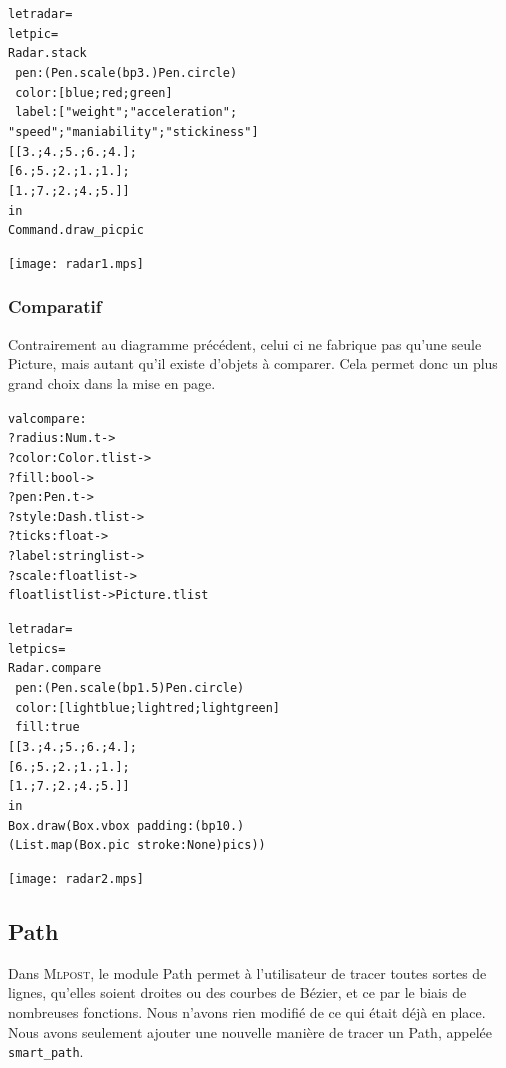 \documentclass[a4paper,12pt]{article}
\newcommand{\mlpost}{\textsc{Mlpost}}
\begin{document}
\bigskip

\begin{minipage}{0.5\linewidth}
  \begin{alltt}
    let radar =
    let pic =
    Radar.stack
    ~pen:(Pen.scale (bp 3.) Pen.circle)
    ~color:[blue;red;green]
    ~label:["weight";"acceleration";
      "speed";"maniability";"stickiness"]
    [[3.;4.;5.;6.;4.];
      [6.;5.;2.;1.;1.];
      [1.;7.;2.;4.;5.]]
    in
    Command.draw_pic pic
  \end{alltt}
\end{minipage}
\begin{minipage}{0.5\linewidth}
\begin{center}
\texttt{[image: radar1.mps]}
\end{center}
\end{minipage}

\subsubsection{Comparatif}
Contrairement au diagramme précédent, celui ci ne fabrique pas qu'une seule Picture, mais autant qu'il existe d'objets à comparer. Cela permet donc un plus grand choix dans la mise en page.
\begin{alltt}
 val compare :
 ?radius:Num.t ->
 ?color:Color.t list ->
 ?fill:bool ->
 ?pen:Pen.t ->
 ?style:Dash.t list ->
 ?ticks:float ->
 ?label:string list ->
 ?scale:float list ->
 float list list -> Picture.t list
\end{alltt}


\bigskip

\begin{minipage}{0.5\linewidth}
  \begin{alltt}
    let radar =
    let pics =
    Radar.compare
    ~pen:(Pen.scale (bp 1.5) Pen.circle)
    ~color:[lightblue;lightred;lightgreen] 
    ~fill:true
    [[3.;4.;5.;6.;4.];
      [6.;5.;2.;1.;1.];
      [1.;7.;2.;4.;5.]]
    in
    Box.draw (Box.vbox ~padding:(bp 10.) 
    (List.map (Box.pic ~stroke:None) pics))

  \end{alltt}
\end{minipage}
\begin{minipage}{0.5\linewidth}
\begin{center}
\texttt{[image: radar2.mps]}
\end{center}
\end{minipage}

\subsection{Path}
Dans \mlpost, le module Path permet à l'utilisateur de tracer toutes sortes de lignes, qu'elles soient droites ou des courbes de Bézier, et ce par le biais de nombreuses fonctions.
Nous n'avons rien modifié de ce qui était déjà en place. Nous avons seulement ajouter une nouvelle manière de tracer un Path, appelée \texttt{smart\_path}. 
\bigskip 
\end{document}
